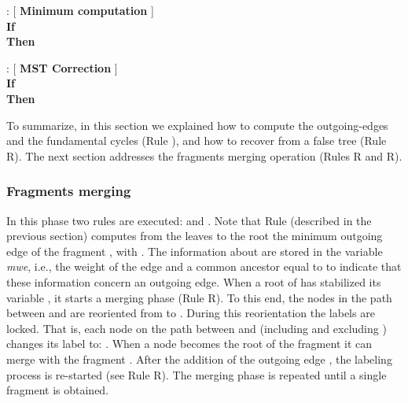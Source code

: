 \documentclass[11pt,a4paper]{article}
\newcommand{\m}{\mbox{\it mwe}}
\newcommand{\RC}{\mbox{\rm R}} \newcommand{\RReo}{\mbox{\rm R}}
\newcommand{\RF}{\mbox{\rm R}}
\newcommand{\REnd}{\mbox{\rm R}}
\begin{document}
\begin{description}
\item : [ \textbf{Minimum computation} ] \\
\textbf{If} \\
\textbf{Then } 
\end{description}



\begin{description}
\item : [ \textbf{MST Correction} ] \\
\textbf{If} \\
\textbf{Then } 
\end{description}

To summarize, in this section we explained how to compute the outgoing-edges and the
fundamental cycles (Rule \RMin\/),  and how to recover from a false tree
(Rule \RC\/). The next section addresses the fragments merging operation (Rules \RF\/ and \REnd).

\subsubsection{Fragments merging}

In this phase two rules are executed:  and . 
Note that Rule \RMin\/ (described in the previous section) computes
from the leaves to the root 
the minimum outgoing edge  of the fragment , with .
The information about  are stored in the variable \m\/, i.e., the weight of the edge and a common ancestor equal to  to indicate that these information concern an outgoing edge.  
When a root  of  has stabilized its variable , it starts a merging phase (Rule \RF\/).
To this end, the nodes in the path between  and  are reoriented from  to .
During this reorientation the labels are locked. That is, each node  on the path between  and  (including  and excluding ) changes its label to: .
When a node  becomes the root of the fragment  it can merge
with the fragment .
After the addition of the outgoing edge , the labeling process is re-started (see Rule \REnd).
The merging phase is repeated until a single fragment is obtained.


 
\end{document}

